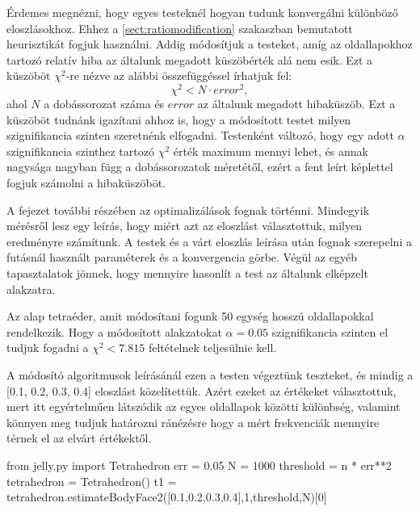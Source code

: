 
Érdemes megnézni, hogy egyes testeknél hogyan tudunk konvergálni különböző eloszlásokhoz.
Ehhez a \ref{sect:ratiomodification} szakaszban bemutatott heurisztikát fogjuk használni.
Addig módosítjuk a testeket, amíg az oldallapokhoz tartozó relatív hiba az általunk megadott küszöbérték alá nem esik.
Ezt a küszöböt $\chi^2$-re nézve az alábbi összefüggéssel írhatjuk fel:
\[
\chi^2 < N \cdot error^2,
\]
ahol $N$ a dobássorozat száma és $error$ az általunk megadott hibaküszöb.
Ezt a küszöböt tudnánk igazítani ahhoz is, hogy a módosított testet milyen szignifikancia szinten szeretnénk elfogadni.
Testenként változó, hogy egy adott $\alpha$ szignifikancia szinthez tartozó  $\chi^2$ érték maximum mennyi lehet, és annak nagysága nagyban függ a dobássorozatok méretétől, ezért a fent leírt képlettel fogjuk számolni a hibaküszöböt.

A fejezet további részében az optimalizálások fognak történni.
Mindegyik mérésről lesz egy leírás, hogy miért azt az eloszlást választottuk, milyen eredményre számítunk.
A testek és a várt eloszlás leírása után fognak szerepelni a futásnál használt paraméterek és a konvergencia görbe.
Végül az egyéb tapasztalatok jönnek, hogy mennyire hasonlít a test az általunk elképzelt alakzatra.


Az alap tetraéder, amit módosítani fogunk 50 egység hosszú oldallapokkal rendelkezik.
Hogy a módosított alakzatokat $\alpha = 0.05$ szignifikancia szinten el tudjuk fogadni a $\chi^2 < 7.815$ feltételnek teljesülnie kell.

A módosító algoritmusok leírásánál ezen a testen végeztünk teszteket, és mindig a [0.1, 0.2, 0.3, 0.4] eloszlást közelítettük.
Azért ezeket az értékeket választottuk, mert itt egyértelműen látszódik az egyes oldallapok közötti különbség, valamint könnyen meg tudjuk határozni ránézésre hogy a mért frekvenciák mennyire térnek el az elvárt értékektől.

\begin{python}
from jelly.py import Tetrahedron
err = 0.05
N = 1000
threshold = n * err**2
tetrahedron = Tetrahedron()
t1 = tetrahedron.estimateBodyFace2([0.1,0.2,0.3,0.4],1,threshold,N)[0]
\end{python}

